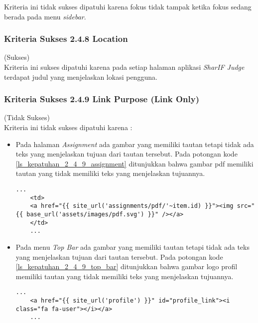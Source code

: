 Kriteria ini tidak sukses dipatuhi karena fokus tidak tampak ketika fokus sedang berada pada menu \textit{sidebar}.

\subsubsection{Kriteria Sukses 2.4.8 Location}
\label{subsubsec:kepatuhan_kriteria_2.4.8}
(Sukses) \\

Kriteria ini sukses dipatuhi karena pada setiap halaman aplikasi \textit{SharIF Judge} terdapat judul yang menjelaskan lokasi pengguna.

\subsubsection{Kriteria Sukses 2.4.9 Link Purpose (Link Only)}
\label{subsubsec:kepatuhan_kriteria_2.4.9}
(Tidak Sukses) \\

Kriteria ini tidak sukses dipatuhi karena :
\begin{itemize}
	\item Pada halaman \textit{Assignment} ada gambar yang memiliki tautan tetapi tidak ada teks yang menjelaskan tujuan dari tautan tersebut. Pada potongan kode \ref{ls_kepatuhan_2_4_9_assignment} ditunjukkan bahwa gambar pdf memiliki tautan yang tidak memiliki teks yang menjelaskan tujuannya.
	\begin{lstlisting}[basicstyle=\ttfamily, frame=single,
	columns=fullflexible, keepspaces=true, breaklines=true, label=ls_kepatuhan_2_4_9_assignment, caption=Kriteria Sukses 2.4.9 - Gambar PDF]
	...
	<td>
	<a href="{{ site_url('assignments/pdf/'~item.id) }}"><img src="{{ base_url('assets/images/pdf.svg') }}" /></a>
	</td>
	...
	\end{lstlisting}
	
	\item Pada menu \textit{Top Bar} ada gambar yang memiliki tautan tetapi tidak ada teks yang menjelaskan tujuan dari tautan tersebut. Pada potongan kode \ref{ls_kepatuhan_2_4_9_top_bar} ditunjukkan bahwa gambar logo profil memiliki tautan yang tidak memiliki teks yang menjelaskan tujuannya.
	\begin{lstlisting}[basicstyle=\ttfamily, frame=single,
	columns=fullflexible, keepspaces=true, breaklines=true, label=ls_kepatuhan_2_4_9_top_bar, caption=Kriteria Sukses 2.4.9 - Gambar Logo Profile]
	...
	<a href="{{ site_url('profile') }}" id="profile_link"><i class="fa fa-user"></i></a>
	...
	\end{lstlisting}
	
\end{itemize}

